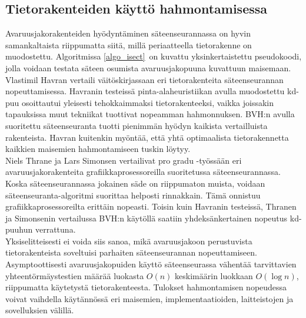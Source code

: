 \documentclass[a4paper, 12pt, titlepage]{article}
\begin{document}


\subsection{Tietorakenteiden käyttö hahmontamisessa}

Avaruusjakorakenteiden hyödyntäminen säteenseurannassa on hyvin samankaltaista riippumatta siitä, millä periaatteella tietorakenne on muodostettu. Algoritmissa \ref{algo_isect} on kuvattu yksinkertaistettu pseudokoodi, jolla voidaan testata säteen osumista avaruusjakopuuna kuvattuun maisemaan.\\ 



Vlastimil Havran vertaili väitöskirjassaan eri tietorakenteita säteenseurannan nopeuttamisessa. Havranin testeissä pinta-alaheuristiikan avulla muodostettu kd-puu osoittautui yleisesti tehokkaimmaksi tietorakenteeksi, vaikka joissakin tapauksissa muut tekniikat tuottivat nopeamman hahmonnuksen. BVH:n avulla suoritettu säteenseuranta tuotti pienimmän hyödyn kaikista vertailluista rakenteista. Havran kuitenkin myöntää, että yhtä optimaalista tietorakennetta kaikkien maisemien hahmontamiseen tuskin löytyy. \citep[.]{havran}\\

Niels Thrane ja Lars Simonsen vertailivat pro gradu -työssään eri avaruusjakorakenteita grafiikkaprosessoreilla suoritetussa säteenseurannassa. Koska säteenseurannassa jokainen säde on riippumaton muista, voidaan säteenseuranta-algoritmi suorittaa helposti rinnakkain. Tämä onnistuu grafiikkaprosessoreilta erittäin nopeasti. Toisin kuin Havranin testeissä, Thranen ja Simonsenin vertailussa BVH:n käytöllä saatiin yhdeksänkertainen nopeutus kd-puuhun verrattuna. \citep[.]{thrane}\\  

Yksiselitteisesti ei voida siis sanoa, mikä avaruusjakoon perustuvista tietorakenteista soveltuisi parhaiten säteenseurannan nopeuttamiseen. Asymptoottisesti avaruusjakopuiden käyttö säteenseurassa vähentää tarvittavien yhteentörmäystestien määrää luokasta $O(n)$ keskimäärin luokkaan $O(\log n)$, riippumatta käytetystä tietorakenteesta. Tulokset hahmontamisen nopeudessa voivat vaihdella käytännössä eri maisemien, implementaatioiden, laitteistojen ja sovelluksien välillä. \citep[.]{wald04} \\
\end{document}
